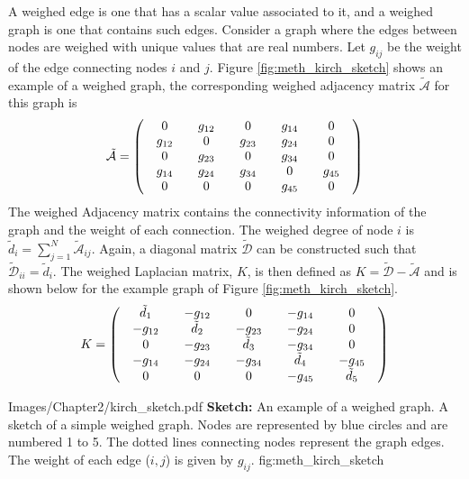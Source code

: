 A weighed edge is one that has a scalar value associated to it, and a weighed graph is one that contains such edges. Consider a graph where the edges between nodes are weighed with unique values that are real numbers. Let $g_{\textit{ij}}$ be the weight of the edge connecting nodes $\textit{i}$ and $\textit{j}$. Figure \ref{fig:meth_kirch_sketch} shows an example of a weighed graph, the corresponding weighed adjacency matrix $\tilde{\mathcal{A}}$ for this graph is
\begin{equation}
\setlength\arraycolsep{10pt}
\tilde{\mathcal{A}} = 
\left( \begin{array}{ccccc}
0 & g_{12} & 0 & g_{14} & 0 \\
g_{12} & 0 & g_{23} & g_{24} & 0 \\
0 & g_{23} & 0 & g_{34} & 0\\
g_{14} & g_{24} & g_{34} & 0 & g_{45}\\
0 & 0 & 0 & g_{45} & 0
\end{array} \right)
\label{eq: k_matrix}
\end{equation}
The weighed Adjacency matrix contains the connectivity information of the graph and the weight of each connection. The weighed degree of node $\textit{i}$ is $\tilde{d}_\textit{i} = \sum_{\textit{j} = 1}^{N} \tilde{\mathcal{A}}_{\textit{ij}}$. Again, a diagonal matrix $\tilde{\mathcal{D}}$ can be constructed such that $\tilde{\mathcal{D}}_{\textit{ii}} = \tilde{d}_\textit{i}$. The weighed Laplacian matrix, $K$, is then defined as $K =\tilde{\mathcal{D}} - \tilde{\mathcal{A}}$ and is shown below for the example graph of Figure \ref{fig:meth_kirch_sketch}.
\begin{equation}
\setlength\arraycolsep{10pt}
K = 
\left( \begin{array}{ccccc}
\tilde{d}_1 & -g_{12} & 0 & -g_{14} & 0 \\
-g_{12} & \tilde{d}_2 & -g_{23} & -g_{24} & 0 \\
0 & -g_{23} & \tilde{d}_3 & -g_{34} & 0\\
-g_{14} & -g_{24} & -g_{34} & \tilde{d}_4 & -g_{45}\\
0 & 0 & 0 & -g_{45} & \tilde{d}_5
\end{array} \right)
\label{eq: kirch_matrix}
\end{equation}

{Images/Chapter2/kirch_sketch.pdf}
{\textbf{Sketch:} An example of a weighed graph.}
{A sketch of a simple weighed graph. Nodes are represented by blue circles and are numbered 1 to 5. The dotted lines connecting nodes represent the graph edges. The weight of each edge ($i,j$) is given by $g_{\textit{ij}}$.}
{fig:meth_kirch_sketch}

